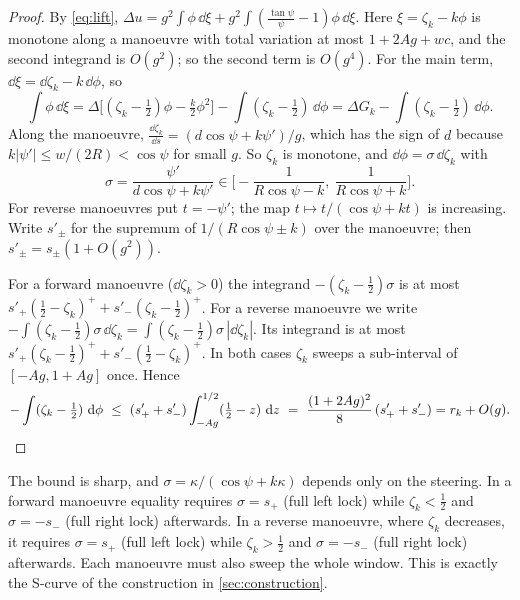 \begin{proof}
By \eqref{eq:lift}, $\Delta u=g^2\int\phi\,\dd\xi+g^2\int(\tfrac{\tan\psi}{\psi}-1)\phi\,\dd\xi$.
Here $\xi=\zeta_k-k\phi$ is monotone along a manoeuvre with total variation at most $1+2Ag+wc$, and the second integrand is $O(g^2)$; so the second term is $O(g^4)$.
For the main term, $\dd\xi=\dd\zeta_k-k\,\dd\phi$, so
\[
  \int\phi\,\dd\xi=\Delta\Big[(\zeta_k-\tfrac12)\phi-\tfrac k2\phi^2\Big]-\int(\zeta_k-\tfrac12)\,\dd\phi=\Delta G_k-\int(\zeta_k-\tfrac12)\,\dd\phi .
\]
Along the manoeuvre, $\frac{\dd\zeta_k}{\dd s}=(d\cos\psi+k\psi')/g$, which has the sign of $d$ because $k|\psi'|\le w/(2R)<\cos\psi$ for small $g$.
So $\zeta_k$ is monotone, and $\dd\phi=\sigma\,\dd\zeta_k$ with
\[
  \sigma=\frac{\psi'}{d\cos\psi+k\psi'}\in\Big[-\frac1{R\cos\psi-k},\ \frac1{R\cos\psi+k}\Big].
\]
For reverse manoeuvres put $t=-\psi'$; the map $t\mapsto t/(\cos\psi+kt)$ is increasing.
Write $s'_\pm$ for the supremum of $1/(R\cos\psi\pm k)$ over the manoeuvre; then $s'_\pm=s_\pm(1+O(g^2))$.

For a forward manoeuvre ($\dd\zeta_k>0$) the integrand $-(\zeta_k-\frac12)\sigma$ is at most $s'_+(\frac12-\zeta_k)^+ + s'_-(\zeta_k-\frac12)^+$.
For a reverse manoeuvre we write $-\int(\zeta_k-\frac12)\sigma\,\dd\zeta_k=\int(\zeta_k-\frac12)\sigma\,|\dd\zeta_k|$.
Its integrand is at most $s'_+(\zeta_k-\frac12)^+ + s'_-(\frac12-\zeta_k)^+$.
In both cases $\zeta_k$ sweeps a sub-interval of $[-Ag,1+Ag]$ once.
Hence
\[
  -\int(\zeta_k-\tfrac12)\,\dd\phi\ \le\ (s'_++s'_-)\int_{-Ag}^{1/2}(\tfrac12-z)\,\dd z\ =\ \frac{(1+2Ag)^2}8\,(s'_++s'_-)=r_k+O(g).\qedhere
\]
\end{proof}

The bound is sharp, and $\sigma=\kappa/(\cos\psi+k\kappa)$ depends only on the steering.
In a forward manoeuvre equality requires $\sigma=s_+$ (full left lock) while $\zeta_k<\frac12$ and $\sigma=-s_-$ (full right lock) afterwards.
In a reverse manoeuvre, where $\zeta_k$ decreases, it requires $\sigma=s_+$ (full left lock) while $\zeta_k>\frac12$ and $\sigma=-s_-$ (full right lock) afterwards.
Each manoeuvre must also sweep the whole window.
This is exactly the S-curve of the construction in \cref{sec:construction}.
